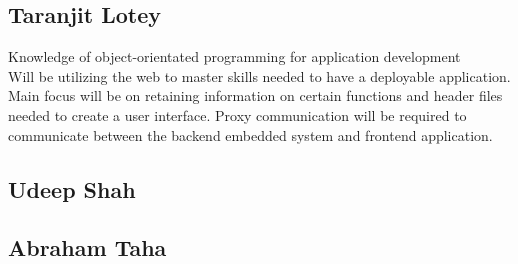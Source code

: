 \documentclass[12pt]{article}
\begin{document}
\subsection*{Taranjit Lotey}
Knowledge of object-orientated programming for application development \\
Will be utilizing the web to master skills needed to have a deployable application.
Main focus will be on retaining information on certain functions and header files 
needed to create a user interface. Proxy communication will be required to communicate 
between the backend embedded system and frontend application.\\

\subsection*{Udeep Shah}


\subsection*{Abraham Taha}
\end{document}
